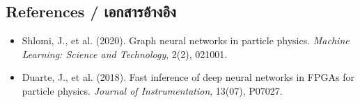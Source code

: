 \subsection{References \quad / \quad \textthai{เอกสารอ้างอิง}}
\begin{itemize}
    \item Shlomi, J., et al. (2020). Graph neural networks in particle physics. \textit{Machine Learning: Science and Technology}, 2(2), 021001.
    \item Duarte, J., et al. (2018). Fast inference of deep neural networks in FPGAs for particle physics. \textit{Journal of Instrumentation}, 13(07), P07027.
\end{itemize}
